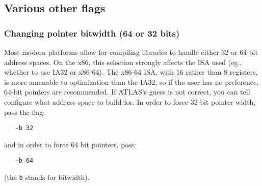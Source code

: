 \documentclass[11pt]{article}
\newcommand{\Wskip}[1]{ }
\begin{document}
\Wskip{
\subsection{Manually setting OS, architecture, assembly dialect}
\label{sec-OS-override}

Configure's selection of operating system, architecture, assembly dialect
and SIMD vectorization type are all controlled by enumerated types.
Occasionally, configure will misdetect one of these values and so
configure provides
flags for overriding configures detecting of these features.

\subsubsection{Manually overriding the assembly dialect}
\subsubsection{Manually overriding SIMD vectorization type}
\label{sec-SIMD-override}
Also, the installer
may occasionally want to refrain from using a feature that this machine
possesses, but other machines that plan to use the same library don't.
For instance, the installation machine might have SSE3, but the installer
wants to use the same library on machines that possess only SSE2, and so
the installer wants to use only SSE2, even though this will make the library
sub-optimal on the machine possessing SSE3.  
}

\subsection{Various other flags}
\label{sec-flag-other}

\subsubsection{Changing pointer bitwidth (64 or 32 bits)}
\label{sec-bitwidth}
Most modern platforms allow for compiling libraries to handle either 32 or
64 bit address spaces.  On the x86, this selection strongly affects the ISA
used (eg., whether to use IA32 or x86-64).  The x86-64 ISA, with 16 rather
than 8 registers, is more
amenable to optimization than the IA32, so if the user has no preference,
64-bit pointers are recommended.
If ATLAS's guess is not correct,
you can tell configure what address space to build for.  In order to force
32-bit pointer width, pass the flag:
\vspace*{-0.1in}
\begin{verbatim}
   -b 32
\end{verbatim}
and in order to force 64 bit pointers, pass:
\vspace*{-0.1in}
\begin{verbatim}
   -b 64
\end{verbatim}
(the {\tt b} stands for bitwidth).
\end{document}
